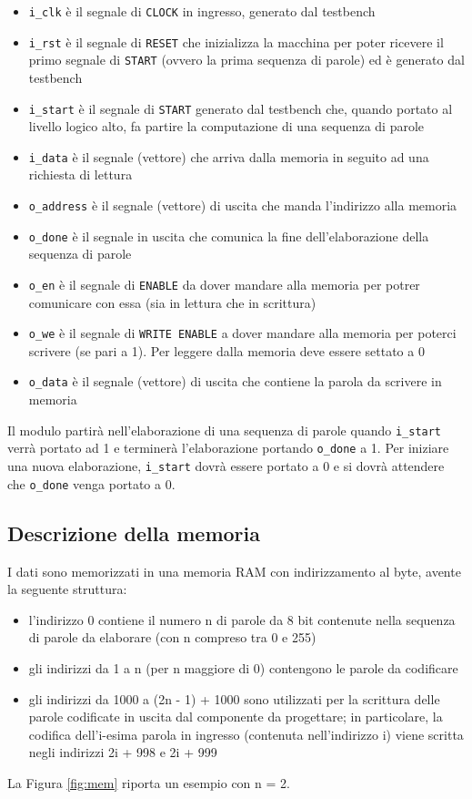 \documentclass{article}
\begin{document}
\begin{itemize}
    \item \texttt{i\_clk} è il segnale di \texttt{CLOCK} in ingresso, generato dal testbench
    \item \texttt{i\_rst} è il segnale di \texttt{RESET} che inizializza la macchina per poter ricevere il primo segnale di \texttt{START} (ovvero la prima sequenza di parole) ed è generato dal testbench
    \item \texttt{i\_start} è il segnale di \texttt{START} generato dal testbench che, quando portato al livello logico alto, fa partire la computazione di una sequenza di parole
    \item \texttt{i\_data} è il segnale (vettore) che arriva dalla memoria in seguito ad una richiesta di lettura
    \item \texttt{o\_address} è il segnale (vettore) di uscita che manda l'indirizzo alla memoria
    \item \texttt{o\_done} è il segnale in uscita che comunica la fine dell'elaborazione della sequenza di parole
    \item \texttt{o\_en} è il segnale di \texttt{ENABLE} da dover mandare alla memoria per potrer comunicare con essa (sia in lettura che in scrittura)
    \item \texttt{o\_we} è il segnale di \texttt{WRITE ENABLE} a dover mandare alla memoria per poterci scrivere (se pari a 1). Per leggere dalla memoria deve essere settato a 0
    \item \texttt{o\_data} è il segnale (vettore) di uscita che contiene la parola da scrivere in memoria
\end{itemize}
Il modulo partirà nell'elaborazione di una sequenza di parole quando \texttt{i\_start} verrà portato ad 1 e terminerà l'elaborazione portando \texttt{o\_done} a 1. Per iniziare una nuova elaborazione, \texttt{i\_start} dovrà essere portato a 0 e si dovrà attendere che \texttt{o\_done} venga portato a 0.

\subsection{Descrizione della memoria}

I dati sono memorizzati in una memoria RAM con indirizzamento al byte, avente la seguente struttura:
\begin{itemize}
    \item l'indirizzo 0 contiene il numero  n di parole da 8 bit contenute nella sequenza di parole da elaborare (con n compreso tra 0 e 255)
    \item gli indirizzi da 1 a n (per n maggiore di 0) contengono le parole da codificare
    \item gli indirizzi da 1000 a (2n - 1) + 1000 sono utilizzati per la scrittura delle parole codificate in uscita dal componente da progettare; in particolare, la codifica dell'i-esima parola in ingresso (contenuta nell'indirizzo i) viene scritta negli indirizzi 2i + 998 e 2i + 999
\end{itemize}
La Figura \ref{fig:mem} riporta un esempio con n = 2.
\end{document}
